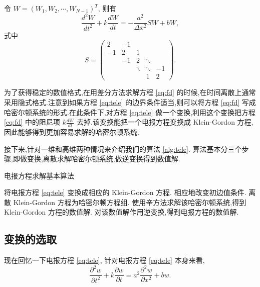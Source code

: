 令 $W=(W_1,W_2,\cdots,W_{N-1})^T$, 则有
\begin{equation}\label{eq:fd}
\frac{d^2 W}{d t^2}+k\frac{d W}{d t}= -\frac{a^2}{\Delta x^2}SW + b W,
\end{equation}
式中
\begin{equation}\label{eq:s}
S=\begin{pmatrix}
2&-1&&&\\
-1&2&1&&\\
&-1&2&\ddots&\\
&&\ddots&\ddots&-1\\
&&&1&2
\end{pmatrix}.
\end{equation}

为了获得稳定的数值格式,在用差分方法求解方程 \eqref{eq:fd} 的时候,在时间离散上通常采用隐式格式.注意到如果方程 \eqref{eq:tele} 的边界条件适当,则可以将方程 \eqref{eq:fd} 写成哈密尔顿系统的形式.在此条件下,对方程 \eqref{eq:tele} 做一个变换,利用这个变换把方程 \eqref{eq:fd} 中的阻尼项 $k\frac{d W}{d t}$ 去掉.该变换能把一个电报方程变换成 Klein-Gordon 方程,因此能够得到更加容易求解的哈密尔顿系统.

接下来,针对一维和高维两种情况来介绍我们的算法 \ref{alg:tele}. 算法基本分三个步骤,即做变换,离散求解哈密尔顿系统,做逆变换得到数值解.

\begin{algorithm}
\caption{电报方程求解基本算法}
\begin{algorithmic}[1]
\STATE 将电报方程 \eqref{eq:tele} 变换成相应的 Klein-Gordon 方程. 相应地改变初边值条件. \newline
\STATE 离散 Klein-Gordon 方程为哈密尔顿方程组. 使用辛方法求解该哈密尔顿系统,得到 Klein-Gordon 方程的数值解. \newline
\STATE 对该数值解作用逆变换,得到电报方程的数值解.
\end{algorithmic}
\label{alg:tele}
\end{algorithm}

\subsection{变换的选取}\label{sec:02transform}
现在回忆一下电报方程 \eqref{eq:tele}, 针对电报方程 \eqref{eq:tele} 本身来看,
\begin{equation}\label{eq:telegraph}
\frac{\partial ^2 w}{\partial t^2}+k\frac{\partial w}{\partial t}=a^2 \frac{\partial ^2 w}{\partial x^2} + b w.
\end{equation}

